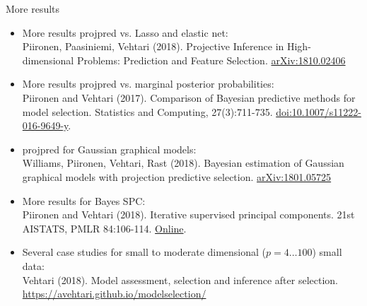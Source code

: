\documentclass[english,t]{beamer}
\begin{document}
\begin{frame}
  
  {\Large\color{navyblue} More results}\\

  {\footnotesize
  \begin{itemize}
  \item More results projpred vs. Lasso and elastic net:\\
    Piironen, Paasiniemi, Vehtari (2018). Projective Inference in
    High-dimensional Problems: Prediction and Feature Selection.
    \href{https://arxiv.org/abs/arXiv:1810.02406}{arXiv:1810.02406}
  \item More results projpred vs. marginal posterior probabilities:\\
    Piironen and Vehtari (2017). Comparison of Bayesian predictive
    methods for model selection. Statistics and Computing,
    27(3):711-735.
    \href{https://dx.doi.org/10.1007/s11222-016-9649-y}{doi:10.1007/s11222-016-9649-y}.
  \item projpred for Gaussian graphical models:\\
    Williams, Piironen, Vehtari, Rast (2018). Bayesian estimation of Gaussian graphical models with projection predictive selection. \href{https://arxiv.org/abs/1801.05725}{arXiv:1801.05725}
  \item More results for Bayes SPC:\\
    Piironen and Vehtari (2018). Iterative supervised principal components. 21st AISTATS, PMLR 84:106-114. \href{http://proceedings.mlr.press/v84/piironen18a.html}{Online}.
  \item Several case studies for small to moderate dimensional ($p=4 \ldots 100$) small data:\\
    Vehtari (2018). Model assessment, selection and inference after
    selection. \url{https://avehtari.github.io/modelselection/}
  \end{itemize}
  }
\end{frame}
\end{document}
